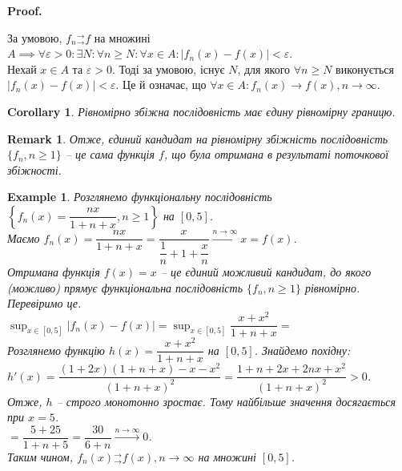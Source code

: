 \documentclass[a4paper, 10pt]{article}
\makeatletter
\def\huge{\displaystyle}
\theoremstyle{theoremdd}
\theoremstyle{theoremdd}
\theoremstyle{theoremdd}
\theoremstyle{theoremdd}
\theoremstyle{theoremdd}
\newtheorem{example}[theorem]{Example}
\theoremstyle{theoremdd}
\theoremstyle{theoremdd}
\newtheorem{remark}[theorem]{Remark}
\theoremstyle{theoremdd}
\theoremstyle{theoremdd}
\newtheorem{corollary}[theorem]{Corollary}
\renewenvironment{proof}[1][Proof.\\]{\par
\pushQED{\hfill \qed}%
\normalfont \topsep6\p@\@plus6\p@\relax
\trivlist
\item\relax
{\bfseries
#1\@addpunct{.}}\hspace\labelsep\ignorespaces
}{%
\popQED\endtrivlist\@endpefalse
}
\newcommand{\tounif}{^\rightarrow_\rightarrow}
\makeatother
\begin{document}
\begin{proof}
За умовою, $f_n{}\tounif f$ на множині $A \implies \forall \varepsilon > 0: \exists N: \forall n \geq N: \forall x \in A: |f_n(x) - f(x)| < \varepsilon$.\\
Нехай $x \in A$ та $\varepsilon > 0$. Тоді за умовою, існує $N$, для якого $\forall n \geq N$ виконується $|f_n(x) - f(x)| < \varepsilon$. Це й означає, що $\forall x \in A: f_n(x) \to f(x), n \to \infty$.
\end{proof}

\begin{corollary}
Рівномірно збіжна послідовність має єдину рівномірну границю.
\end{corollary}

\begin{remark}
Отже, єдиний кандидат на рівномірну збіжність послідовність $\{f_n, n \geq 1\}$ -- це сама функція $f$, що була отримана в результаті поточкової збіжності.
\end{remark}

\begin{example}
Розглянемо функціональну послідовність $\left\{ f_n(x) = \dfrac{nx}{1+n+x}, n \geq 1 \right\}$ на $[0,5]$.\\
Маємо $f_n(x) = \dfrac{nx}{1+n+x} = \dfrac{x}{\dfrac{1}{n}+ 1 + \dfrac{x}{n}} \overset{n \to \infty}{\longrightarrow} x = f(x)$. \\
Отримана функція $f(x) = x$ -- це єдиний можливий кандидат, до якого (можливо) прямує функціональна послідовність $\{f_n, n \geq 1\}$ рівномірно. Перевіримо це.\\
$\huge\sup_{x \in [0,5]} |f_n(x) - f(x)| = \sup_{x \in [0,5]} \dfrac{x+x^2}{1+n+x} \boxed{=}$\\
Розглянемо функцію $h(x) = \dfrac{x+x^2}{1+n+x}$ на $[0,5]$. Знайдемо похідну:\\
$h'(x) = \dfrac{(1+2x)(1+n+x) - x-x^2}{(1+n+x)^2} = \dfrac{1+n+2x+2nx+x^2}{(1+n+x)^2} > 0$.\\
Отже, $h$ -- строго монотонно зростає. Тому найбільше значення досягається при $x = 5$.\\
$\boxed{=} \dfrac{5+25}{1+n+5} = \dfrac{30}{6+n} \overset{n \to \infty}{\longrightarrow} 0$.\\
Таким чином, $f_n(x){}\tounif f(x), n \to \infty$ на множині $[0,5]$.
\end{example}
\end{document}
